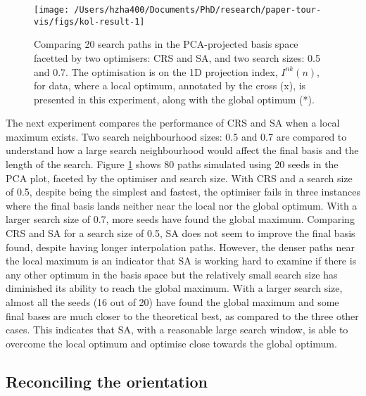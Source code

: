 \begin{Schunk}
\begin{figure}

{\centering \texttt{[image: /Users/hzha400/Documents/PhD/research/paper-tour-vis/figs/kol-result-1]} 

}

\caption[Comparing 20 search paths in the PCA-projected basis space facetted by two optimisers]{Comparing 20 search paths in the PCA-projected basis space facetted by two optimisers: CRS and SA, and two search sizes: 0.5 and 0.7. The optimisation is on the 1D projection index, $I^{nk}(n)$, for  data, where a local optimum, annotated by the cross (x), is presented in this experiment, along with the global optimum (*).}\label{fig:kol-result}
\end{figure}
\end{Schunk}

The next experiment compares the performance of CRS and SA when a local
maximum exists. Two search neighbourhood sizes: 0.5 and 0.7 are compared
to understand how a large search neighbourhood would affect the final
basis and the length of the search. Figure \ref{fig:kol-result} shows 80
paths simulated using 20 seeds in the PCA plot, faceted by the optimiser
and search size. With CRS and a search size of 0.5, despite being the
simplest and fastest, the optimiser fails in three instances where the
final basis lands neither near the local nor the global optimum. With a
larger search size of 0.7, more seeds have found the global maximum.
Comparing CRS and SA for a search size of 0.5, SA does not seem to
improve the final basis found, despite having longer interpolation
paths. However, the denser paths near the local maximum is an indicator
that SA is working hard to examine if there is any other optimum in the
basis space but the relatively small search size has diminished its
ability to reach the global maximum. With a larger search size, almost
all the seeds (16 out of 20) have found the global maximum and some
final bases are much closer to the theoretical best, as compared to the
three other cases. This indicates that SA, with a reasonable large
search window, is able to overcome the local optimum and optimise close
towards the global optimum.

\hypertarget{reconciling-the-orientation}{%
\subsection{Reconciling the
orientation}\label{reconciling-the-orientation}}

